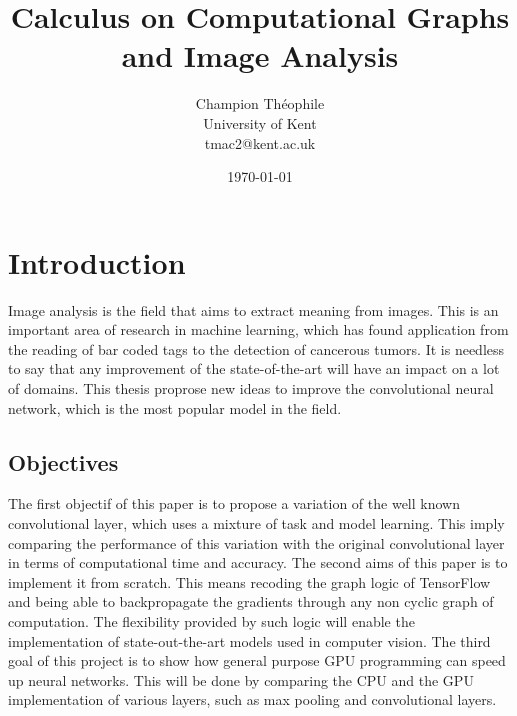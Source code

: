 \documentclass[11pt]{report}
\title{\textbf{Calculus on Computational Graphs and Image Analysis}}
\author{
\begin{tabular}[t]{cc}
Champion Théophile \\
University of Kent \\
tmac2@kent.ac.uk \\
\end{tabular}
}
\date{\today}
\begin{document}
\maketitle

\tableofcontents

\glsaddall
\printglossary[type=\acronymtype, nonumberlist]
\printglossary[type=main, nonumberlist]

\listoffigures
{}
\listoftables
{}

\newpage

\chapter{Introduction}

Image analysis is the field that aims to extract meaning from images. This is an important area of research in machine learning, which has found application from the reading of bar coded tags to the detection of cancerous tumors. It is needless to say that any improvement of the state-of-the-art will have an impact on a lot of domains. This thesis proprose new ideas to improve the convolutional neural network, which is the most popular model in the field.

\section{Objectives}

The first objectif of this paper is to propose a variation of the well known convolutional layer, which uses a mixture of task and model learning. This imply comparing the performance of this variation with the original convolutional layer in terms of computational time and accuracy.
\newline
\newline
\noindent The second aims of this paper is to implement it from scratch. This means recoding the graph logic of TensorFlow and being able to backpropagate the gradients through any non cyclic graph of computation. The flexibility provided by such logic will enable the implementation of state-out-the-art models used in computer vision.
\newline
\newline
\noindent The third goal of this project is to show how general purpose GPU programming can speed up neural networks. This will be done by comparing the CPU and the GPU implementation of various layers, such as max pooling and convolutional layers.
\end{document}
